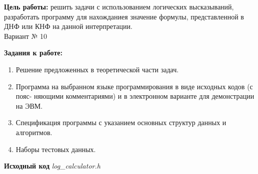\documentclass[a4paper,14pt]{extarticle}
\begin{document}
\newpage
\textbf{Цель работы:} решить задачи с использованием логических высказываний, разработать программу
для нахожданиея значение формулы, представленной в ДНФ или КНФ на данной интерпретации.\\
Вариант № 10
\begin{center}\textbf{Задания к работе:}\end{center}
\begin{enumerate}[1. ]
    \item Решение предложенных в теоретической части задач.

    \item Программа на выбранном языке программирования в виде исходных кодов (с пояс-
    няющими комментариями) и в электронном варианте для демонстрации на ЭВМ.
    
    \item Спецификация программы с указанием основных структур данных и алгоритмов.
    \item Наборы тестовых данных.
\end{enumerate}
\newpage
\textbf{Исходный код}
\textit{log\_calculator.h}
\end{document}

